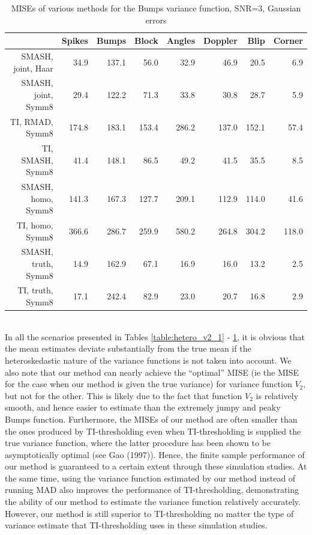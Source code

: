 \documentclass[12pt]{article}
\begin{document}
\begin{table}[ht]
\centering
\begin{tabular}{rrrrrrrr}
  \hline
 & Spikes & Bumps & Block & Angles & Doppler & Blip & Corner \\
  \hline
SMASH, joint, Haar & 34.9 & 137.1 & 56.0 & 32.9 & 46.9 & 20.5 & 6.9 \\
  SMASH, joint, Symm8 & 29.4 & 122.2 & 71.3 & 33.8 & 30.8 & 28.7 & 5.9 \\
  TI, RMAD, Symm8 & 174.8 & 183.1 & 153.4 & 286.2 & 137.0 & 152.1 & 57.4 \\
  TI, SMASH, Symm8 & 41.4 & 148.1 & 86.5 & 49.2 & 41.5 & 35.5 & 8.5 \\
  SMASH, homo, Symm8 & 141.3 & 167.3 & 127.7 & 209.1 & 112.9 & 114.0 & 41.6 \\
  TI, homo, Symm8 & 366.6 & 286.7 & 259.9 & 580.2 & 264.8 & 304.2 & 118.0 \\
  SMASH, truth, Symm8 & 14.9 & 162.9 & 67.1 & 16.9 & 16.0 & 13.2 & 2.5 \\
  TI, truth, Symm8 & 17.1 & 242.4 & 82.9 & 23.0 & 20.7 & 16.8 & 2.9 \\
   \hline
\end{tabular}
\caption{MISEs of various methods for the Bumps variance function, SNR=3, Gaussian errors}
\label{table:hetero_bump_3}
\end{table}
\bigskip\\
In all the scenarios presented in Tables \ref{table:hetero_v2_1} - \ref{table:hetero_bump_3}, it is obvious that the mean estimates deviate substantially from the true mean if the heteroskedastic nature of the variance functions is not taken into account. We also note that our method can nearly achieve the ``optimal'' MISE (ie the MISE for the case when our method is given the true variance) for variance function $V_2$, but not for the other. This is likely due to the fact that function $V_2$ is relatively smooth, and hence easier to estimate than the extremely jumpy and peaky Bumps function. Furthermore, the MISEs of our method are often smaller than the ones produced by TI-thresholding even when TI-thresholding is supplied the true variance function, where the latter procedure has been shown to be asymptotically optimal (see Gao (1997)). Hence, the finite sample performance of our method is guaranteed to a certain extent through these simulation studies. At the same time, using the variance function estimated by our method instead of running MAD also improves the performance of TI-thresholding, demonstrating the ability of our method to estimate the variance function relatively accurately. However, our method is still superior to TI-thresholding no matter the type of variance estimate that TI-thresholding uses in these simulation studies.\bigskip\\
\end{document}
